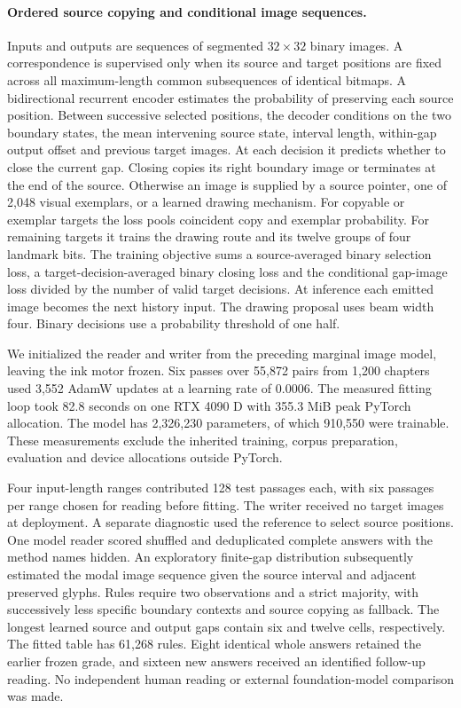\paragraph{Ordered source copying and conditional image sequences.}
Inputs and outputs are sequences of segmented $32\times32$ binary images. A correspondence is supervised only when its source and target positions are fixed across all maximum-length common subsequences of identical bitmaps. A bidirectional recurrent encoder estimates the probability of preserving each source position. Between successive selected positions, the decoder conditions on the two boundary states, the mean intervening source state, interval length, within-gap output offset and previous target images. At each decision it predicts whether to close the current gap. Closing copies its right boundary image or terminates at the end of the source. Otherwise an image is supplied by a source pointer, one of 2,048 visual exemplars, or a learned drawing mechanism. For copyable or exemplar targets the loss pools coincident copy and exemplar probability. For remaining targets it trains the drawing route and its twelve groups of four landmark bits. The training objective sums a source-averaged binary selection loss, a target-decision-averaged binary closing loss and the conditional gap-image loss divided by the number of valid target decisions. At inference each emitted image becomes the next history input. The drawing proposal uses beam width four. Binary decisions use a probability threshold of one half.

We initialized the reader and writer from the preceding marginal image model, leaving the ink motor frozen. Six passes over 55,872 pairs from 1,200 chapters used 3,552 AdamW updates at a learning rate of 0.0006. The measured fitting loop took 82.8 seconds on one RTX 4090 D with 355.3 MiB peak PyTorch allocation. The model has 2,326,230 parameters, of which 910,550 were trainable. These measurements exclude the inherited training, corpus preparation, evaluation and device allocations outside PyTorch.

Four input-length ranges contributed 128 test passages each, with six passages per range chosen for reading before fitting. The writer received no target images at deployment. A separate diagnostic used the reference to select source positions. One model reader scored shuffled and deduplicated complete answers with the method names hidden. An exploratory finite-gap distribution subsequently estimated the modal image sequence given the source interval and adjacent preserved glyphs. Rules require two observations and a strict majority, with successively less specific boundary contexts and source copying as fallback. The longest learned source and output gaps contain six and twelve cells, respectively. The fitted table has 61,268 rules. Eight identical whole answers retained the earlier frozen grade, and sixteen new answers received an identified follow-up reading. No independent human reading or external foundation-model comparison was made.
